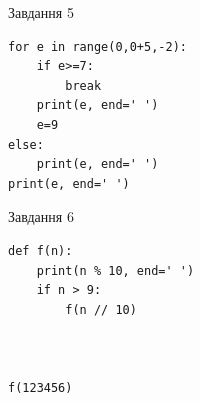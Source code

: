 \documentclass[12pt, ukrainian]{article}
\begin{document}
{\vspace{15mm}
\begin{minipage}[t]{9.7cm}                
{\begin{center}Завдання {5}\end{center}}
\begin{verbatim}
for e in range(0,0+5,-2):
    if e>=7:
        break
    print(e, end=' ')
    e=9
else:
    print(e, end=' ')
print(e, end=' ')
\end{verbatim}     
\end{minipage}
\vline \hspace{8mm}
\begin{minipage}[t]{8.0cm}                
{\begin{center}Завдання {6}\end{center}}
\begin{verbatim}
def f(n):
    print(n % 10, end=' ')
    if n > 9:
        f(n // 10)
    


f(123456)
\end{verbatim}     
\end{minipage}

}
\newpage
\end{document}
